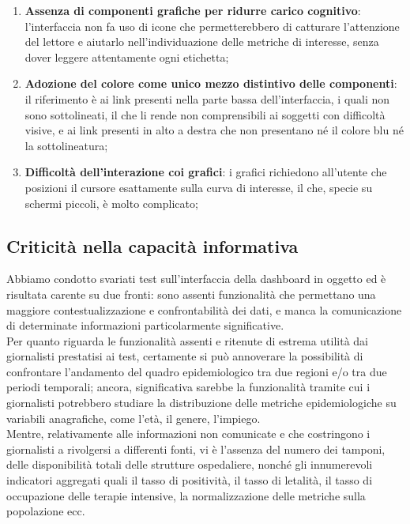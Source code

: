 \documentclass[../../main.tex]{subfiles}
\begin{document}
\begin{enumerate}
    \item \textbf{Assenza di componenti grafiche per ridurre carico cognitivo}: l'interfaccia non fa uso di icone che permetterebbero di catturare l'attenzione del lettore e aiutarlo nell'individuazione delle metriche di interesse, senza dover leggere attentamente ogni etichetta;\label{el:7}
    \item \textbf{Adozione del colore come unico mezzo distintivo delle componenti}: il riferimento è ai link presenti nella parte bassa dell'interfaccia, i quali non sono sottolineati, il che li rende non comprensibili ai soggetti con difficoltà visive, e ai link presenti in alto a destra che non presentano né il colore blu né la sottolineatura;\label{el:8}
    \item \textbf{Difficoltà dell'interazione coi grafici}: i grafici richiedono all'utente che posizioni il cursore esattamente sulla curva di interesse, il che, specie su schermi piccoli, è molto complicato;\label{el:9}
\end{enumerate}

\subsection{Criticità nella capacità informativa}
\label{ss:criticita-informative}
Abbiamo condotto svariati test sull'interfaccia della dashboard in oggetto ed è risultata carente su due fronti: sono assenti funzionalità che permettano una maggiore contestualizzazione e confrontabilità dei dati, e manca la comunicazione di determinate informazioni particolarmente significative.\\
Per quanto riguarda le funzionalità assenti e ritenute di estrema utilità dai giornalisti prestatisi ai test, certamente si può annoverare la possibilità di confrontare l'andamento del quadro epidemiologico tra due regioni e/o tra due periodi temporali; ancora, significativa sarebbe la funzionalità tramite cui i giornalisti potrebbero studiare la distribuzione delle metriche epidemiologiche su variabili anagrafiche, come l'età, il genere, l'impiego.\\
Mentre, relativamente alle informazioni non comunicate e che costringono i giornalisti a rivolgersi a differenti fonti, vi è l'assenza del numero dei tamponi, delle disponibilità totali delle strutture ospedaliere, nonché gli innumerevoli indicatori aggregati quali il tasso di positività, il tasso di letalità, il tasso di occupazione delle terapie intensive, la normalizzazione delle metriche sulla popolazione ecc.
\end{document}
